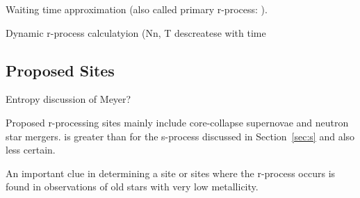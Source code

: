 Waiting time approximation (also called primary r-process: \citealt{meyer1994}).

Dynamic r-process calculatyion (Nn, T descreatese with time


\subsection{Proposed Sites}

Entropy discussion of Meyer?

Proposed r-processing sites mainly include core-collapse supernovae
and neutron star mergers.  is greater than for
the s-process discussed in Section~\ref{sec:s} and also less certain.  

An important clue in determining a site or sites where the r-process
occurs is found in observations of old stars with very low
metallicity.   
